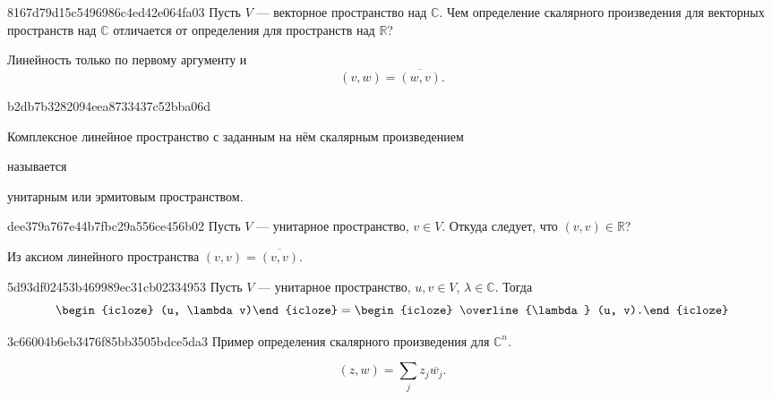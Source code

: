 \begin{note}{8167d79d15c5496986c4ed42e064fa03}
    Пусть \({ V }\) --- векторное пространство над \({ \mathbb C }\).
    Чем определение скалярного произведения для векторных пространств над \({ \mathbb C }\) отличается от определения для пространств над \({ \mathbb R }\)?

    \begin{cloze}{1}
        Линейность только по первому аргументу и
        \[
            (v, w) = \overline{(w, v)}.
        \]
    \end{cloze}
\end{note}

\begin{note}{b2db7b3282094eea8733437c52bba06d}
    \begin{icloze}{2}Комплексное линейное пространство с заданным на нём скалярным произведением\end{icloze} называется \begin{icloze}{1}унитарным или эрмитовым пространством.\end{icloze}
\end{note}

\begin{note}{dee379a767e44b7fbc29a556ce456b02}
    Пусть \({ V }\) --- унитарное пространство, \({ v \in V }\).
    Откуда следует, что \({ (v, v) \in \mathbb R }\)?

    \begin{cloze}{1}
        Из аксиом линейного пространства \({ (v, v) = \overline{(v, v)} }\).
    \end{cloze}
\end{note}

\begin{note}{5d93df02453b469989ec31cb02334953}
    Пусть \({ V }\) --- унитарное пространство, \({ u, v \in V }\),\: \({ \lambda \in \mathbb C }\).
    Тогда
    \[
        \begin{icloze}{2}(u, \lambda v)\end{icloze} = \begin{icloze}{1}\overline{\lambda} (u, v).\end{icloze}
    \]
\end{note}

\begin{note}{3c66004b6eb3476f85bb3505bdce5da3}
    Пример определения скалярного произведения для \({ \mathbb C^{n} }\).

    \begin{cloze}{1}
        \[
            (z, w) = \sum_{j} z_j \overline{w_j}.
        \]
    \end{cloze}
\end{note}

